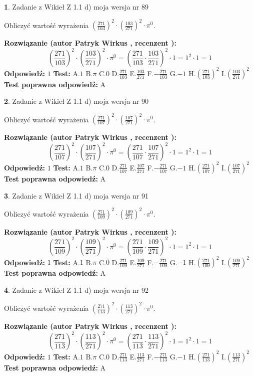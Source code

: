 \documentclass[12pt, a4paper]{article}
\theoremstyle{definition} %
\newtheorem{zad}{}
\newcommand{\zadStart}[1]{\begin{zad}#1\newline}
\newcommand{\zadStop}{\end{zad}}
\newcommand{\rozwStart}[2]{\noindent \textbf{Rozwiązanie (autor #1 , recenzent #2): }\newline}
\newcommand{\rozwStop}{\newline}
\newcommand{\odpStart}{\noindent \textbf{Odpowiedź:}\newline}
\newcommand{\odpStop}{\newline}
\newcommand{\testStart}{\noindent \textbf{Test:}\newline}
\newcommand{\testStop}{\newline}
\newcommand{\kluczStart}{\noindent \textbf{Test poprawna odpowiedź:}\newline}
\newcommand{\kluczStop}{\newline}
\begin{document}
\zadStart{Zadanie z Wikieł Z 1.1 d) moja wersja nr 89}

Obliczyć wartość wyrażenia $(\frac{271}{103})^{2} \cdot (\frac{103}{271})^{2} \cdot \pi^{0}$.
\zadStop
\rozwStart{Patryk Wirkus}{}
$$(\frac{271}{103})^{2} \cdot (\frac{103}{271})^{2} \cdot \pi^{0} = (\frac{271}{103} \cdot \frac{103}{271})^{2} \cdot 1 = 1^{2} \cdot 1 = 1$$
\rozwStop
\odpStart
$1$
\odpStop
\testStart
A.$1$ B.$\pi$ C.$0$ D.$\frac{271}{103}$ E.$\frac{103}{271}$
F.$-\frac{271}{103}$ G.$-1$
H.$(\frac{271}{103})^{2}$
I.$(\frac{103}{271})^{2}$
\testStop
\kluczStart
A
\kluczStop



\zadStart{Zadanie z Wikieł Z 1.1 d) moja wersja nr 90}

Obliczyć wartość wyrażenia $(\frac{271}{107})^{2} \cdot (\frac{107}{271})^{2} \cdot \pi^{0}$.
\zadStop
\rozwStart{Patryk Wirkus}{}
$$(\frac{271}{107})^{2} \cdot (\frac{107}{271})^{2} \cdot \pi^{0} = (\frac{271}{107} \cdot \frac{107}{271})^{2} \cdot 1 = 1^{2} \cdot 1 = 1$$
\rozwStop
\odpStart
$1$
\odpStop
\testStart
A.$1$ B.$\pi$ C.$0$ D.$\frac{271}{107}$ E.$\frac{107}{271}$
F.$-\frac{271}{107}$ G.$-1$
H.$(\frac{271}{107})^{2}$
I.$(\frac{107}{271})^{2}$
\testStop
\kluczStart
A
\kluczStop



\zadStart{Zadanie z Wikieł Z 1.1 d) moja wersja nr 91}

Obliczyć wartość wyrażenia $(\frac{271}{109})^{2} \cdot (\frac{109}{271})^{2} \cdot \pi^{0}$.
\zadStop
\rozwStart{Patryk Wirkus}{}
$$(\frac{271}{109})^{2} \cdot (\frac{109}{271})^{2} \cdot \pi^{0} = (\frac{271}{109} \cdot \frac{109}{271})^{2} \cdot 1 = 1^{2} \cdot 1 = 1$$
\rozwStop
\odpStart
$1$
\odpStop
\testStart
A.$1$ B.$\pi$ C.$0$ D.$\frac{271}{109}$ E.$\frac{109}{271}$
F.$-\frac{271}{109}$ G.$-1$
H.$(\frac{271}{109})^{2}$
I.$(\frac{109}{271})^{2}$
\testStop
\kluczStart
A
\kluczStop



\zadStart{Zadanie z Wikieł Z 1.1 d) moja wersja nr 92}

Obliczyć wartość wyrażenia $(\frac{271}{113})^{2} \cdot (\frac{113}{271})^{2} \cdot \pi^{0}$.
\zadStop
\rozwStart{Patryk Wirkus}{}
$$(\frac{271}{113})^{2} \cdot (\frac{113}{271})^{2} \cdot \pi^{0} = (\frac{271}{113} \cdot \frac{113}{271})^{2} \cdot 1 = 1^{2} \cdot 1 = 1$$
\rozwStop
\odpStart
$1$
\odpStop
\testStart
A.$1$ B.$\pi$ C.$0$ D.$\frac{271}{113}$ E.$\frac{113}{271}$
F.$-\frac{271}{113}$ G.$-1$
H.$(\frac{271}{113})^{2}$
I.$(\frac{113}{271})^{2}$
\testStop
\kluczStart
A
\kluczStop
\end{document}
